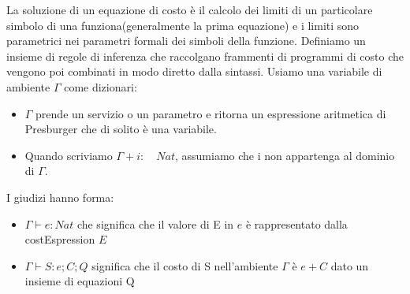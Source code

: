 \documentclass[../../main.tex]{subfiles}
\begin{document}
La soluzione di un equazione di costo è il calcolo dei limiti di un particolare simbolo di una funziona(generalmente la prima equazione) e i limiti sono parametrici nei parametri formali dei simboli della funzione.
Definiamo un insieme di regole di inferenza che raccolgano frammenti di programmi di costo che vengono poi combinati in modo diretto dalla sintassi.
Usiamo una variabile di ambiente $ \varGamma $ come dizionari:
\begin{itemize}
    \item $\varGamma$ prende un servizio o un parametro e ritorna un espressione aritmetica di Presburger che di solito è una variabile.
    \item Quando scriviamo $\varGamma + i : \quad Nat $, assumiamo che i non appartenga al dominio di $\varGamma$.
\end{itemize}
I giudizi hanno forma:
\begin{itemize}
    \item $\varGamma \vdash e : Nat$ che significa che il valore di E in $e$ è rappresentato dalla costEspression $E$
    \item $\varGamma \vdash S : e ; C; Q $ significa che il costo di S nell'ambiente $\varGamma$ è $e + C$ dato un insieme di equazioni Q
\end{itemize}
\end{document}
